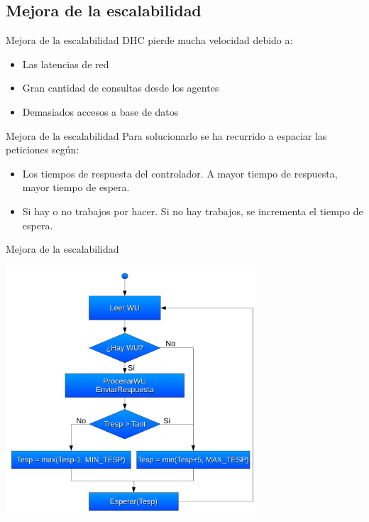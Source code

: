 \documentclass[12pt]{beamer}
\begin{document}
\subsection{Mejora de la escalabilidad}
\begin{frame}{Mejora de la escalabilidad}
	DHC pierde mucha velocidad debido a:
	\pause
	\begin{itemize}
		\item Las latencias de red
		\item Gran cantidad de consultas desde los agentes
		\item Demasiados accesos a base de datos
	\end{itemize}
\end{frame}

\begin{frame}{Mejora de la escalabilidad}
	Para solucionarlo se ha recurrido a espaciar las peticiones según:
	\pause
	\begin{itemize}
		\item Los tiempos de respuesta del controlador. A mayor tiempo de respuesta, mayor tiempo de espera.
		\item Si hay o no trabajos por hacer. Si no hay trabajos, se incrementa el tiempo de espera.
	\end{itemize}
\end{frame}

\begin{frame}{Mejora de la escalabilidad}
	\begin{center}
		\includegraphics[width=0.7\textwidth]{images/control_tiempo_espera.pdf}
	\end{center}
\end{frame}
\end{document}
